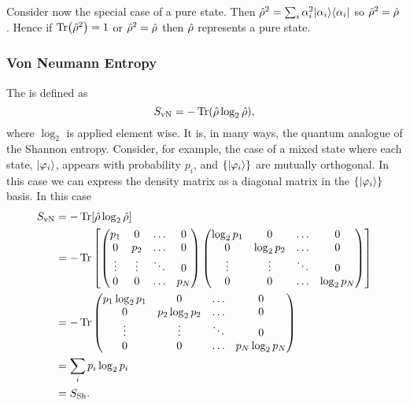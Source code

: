     Consider now the special case of a pure state.
    Then \(\hat{\rho}^2 = \sum_i\alpha_i^2\vert {\alpha_i}\rangle\langle {\alpha_i} \vert\) so \(\hat{\rho}^2 = \hat{\rho}\).
    Hence if \(\Tr(\hat{\rho}^2) = 1\) or \(\hat{\rho}^2 = \hat{\rho}\) then \(\hat{\rho}\) represents a pure state.
    
    \subsubsection{Von Neumann Entropy}
    The  is defined as
    \[S_{\mathrm{vN}} = -\Tr(\hat{\rho}\log_2\hat{\rho}),\]
    where \(\log_2\) is applied element wise.
    It is, in many ways, the quantum analogue of the Shannon entropy.
    Consider, for example, the case of a mixed state where each state, \(\vert {\varphi_i} \rangle\), appears with probability \(p_i\), and \(\{\vert {\varphi_i} \rangle\}\) are mutually orthogonal.
    In this case we can express the density matrix as a diagonal matrix in the \(\{\vert {\varphi_i} \rangle\}\) basis.
    In this case
    \begin{align*}
        S_{\mathrm{vN}} &= -\Tr[\hat{\rho}\log_2\hat{\rho}]\\
        &= -\Tr \left[ 
            \begin{pmatrix}
                p_1    & 0      & \dots  & 0   \\
                0      & p_2    & \dots  & 0   \\
                \vdots & \vdots & \ddots & 0   \\
                0      & 0      & \dots  & p_N
            \end{pmatrix}
            \begin{pmatrix}
                \log_2p_1 & 0         & \dots  & 0         \\
                0         & \log_2p_2 & \dots  & 0         \\
                \vdots    & \vdots    & \ddots & 0         \\
                0         & 0         & \dots  & \log_2p_N
            \end{pmatrix}
        \right]\\
        &= - \Tr
        \begin{pmatrix}
            p_1\log_2p_1    & 0               & \dots  & 0            \\
            0               & p_2\log_2p_2    & \dots  & 0            \\
            \vdots          & \vdots          & \ddots & 0            \\
            0               & 0               & \dots  & p_N\log_2p_N
        \end{pmatrix}
        \\
        &= \sum_i p_i\log_2 p_i\\
        &= S_{\mathrm{Sh}}.
    \end{align*}
